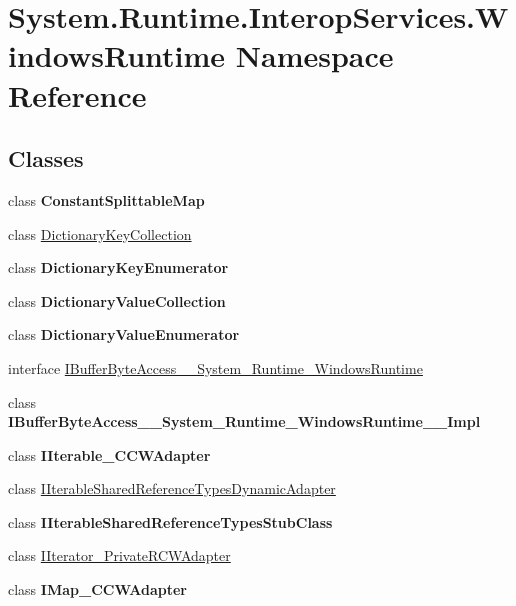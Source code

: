 \hypertarget{namespace_system_1_1_runtime_1_1_interop_services_1_1_windows_runtime}{}\section{System.\+Runtime.\+Interop\+Services.\+Windows\+Runtime Namespace Reference}
\label{namespace_system_1_1_runtime_1_1_interop_services_1_1_windows_runtime}
\subsection*{Classes}
\begin{DoxyCompactItemize}
\item 
class {\bfseries Constant\+Splittable\+Map}
\item 
class \hyperlink{class_system_1_1_runtime_1_1_interop_services_1_1_windows_runtime_1_1_dictionary_key_collection}{Dictionary\+Key\+Collection}
\item 
class {\bfseries Dictionary\+Key\+Enumerator}
\item 
class {\bfseries Dictionary\+Value\+Collection}
\item 
class {\bfseries Dictionary\+Value\+Enumerator}
\item 
interface \hyperlink{interface_system_1_1_runtime_1_1_interop_services_1_1_windows_runtime_1_1_i_buffer_byte_access__8aad8629c9e3be1462b5ca3f6b1769da}{I\+Buffer\+Byte\+Access\+\_\+\+\_\+\+System\+\_\+\+Runtime\+\_\+\+Windows\+Runtime}
\item 
class {\bfseries I\+Buffer\+Byte\+Access\+\_\+\+\_\+\+System\+\_\+\+Runtime\+\_\+\+Windows\+Runtime\+\_\+\+\_\+\+Impl}
\item 
class {\bfseries I\+Iterable\+\_\+\+C\+C\+W\+Adapter}
\item 
class \hyperlink{class_system_1_1_runtime_1_1_interop_services_1_1_windows_runtime_1_1_i_iterable_shared_reference_types_dynamic_adapter}{I\+Iterable\+Shared\+Reference\+Types\+Dynamic\+Adapter}
\item 
class {\bfseries I\+Iterable\+Shared\+Reference\+Types\+Stub\+Class}
\item 
class \hyperlink{class_system_1_1_runtime_1_1_interop_services_1_1_windows_runtime_1_1_i_iterator___private_r_c_w_adapter}{I\+Iterator\+\_\+\+Private\+R\+C\+W\+Adapter}
\item 
class {\bfseries I\+Map\+\_\+\+C\+C\+W\+Adapter}
\item 

\end{DoxyCompactItemize}
